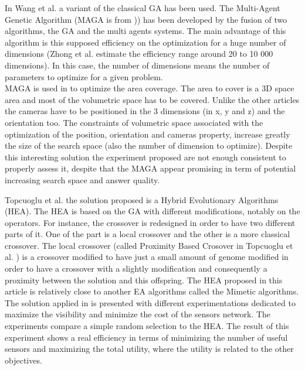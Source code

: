 In Wang et al. \cite{152*wang2009} a variant of the classical GA has been used. The Multi-Agent Genetic Algorithm (MAGA is from \cite{223*zhong2004})) has been developed by the fusion of two algorithms, the GA and the multi agents systems. The main advantage of this algorithm is this supposed efficiency on the optimization for a huge number of dimensions (Zhong et al. estimate the efficiency range around 20 to 10 000 dimensions). In this case, the number of dimensions means the number of parameters to optimize for a given problem.\\
MAGA is used in \cite{152*wang2009} to optimize the area coverage. The area to cover is a 3D space area and most of the volumetric space has to be covered.  Unlike the other articles the cameras have to be positioned in the 3 dimensions (in x, y and z) and the orientation too. The constraints of volumetric space associated with the optimization of the position, orientation and cameras property, increase greatly the size of the search space (also  the number of dimension to optimize).  
Despite this interesting solution the experiment proposed are not enough consistent to properly assess it, despite that the MAGA appear promising in term of potential increasing search space and answer quality. 

Topcuoglu et al. \cite{101*topcuoglu2009} the solution proposed is a Hybrid Evolutionary Algorithms (HEA).  The HEA is based on the GA with different modifications, notably on the operators. For instance, the crossover is redesigned in order to have two different parts of it. 
One of the part is a local crossover and the other is a more classical crossover.  The local crossover (called Proximity Based Crosover in  Topcuoglu et al. \cite{101*topcuoglu2009}) is a crossover modified to have just a small amount of genome modified in order to have a crossover with a slightly modification and consequently  a proximity between the solution and this offspring. 
The HEA proposed in this article is relatively close to another EA algorithms called the Mimetic algorithms. 
The solution applied in \cite{101*topcuoglu2009} is  presented with different experimentations dedicated to maximize the visibility and minimize the cost of the sensors network. The experiments compare a simple random selection to the HEA. The result of this experiment shows a real efficiency in terms of minimizing the number of useful sensors and maximizing the total utility, where the utility is related to the  other objectives. \\

